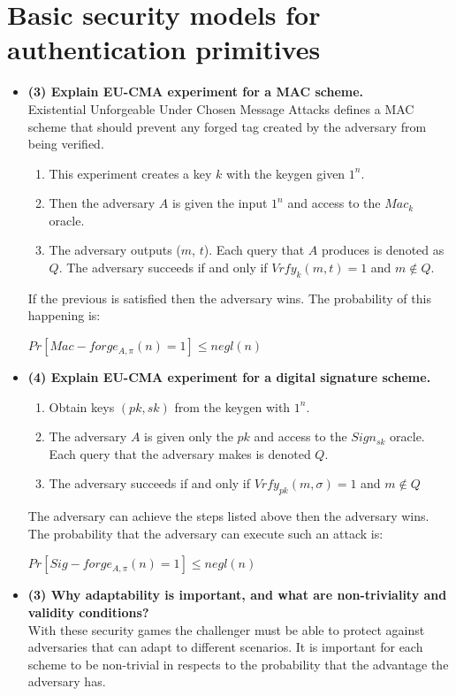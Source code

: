 \documentclass[letterpaper,11pt,notitlepage,fleqn]{article}
\begin{document}
\section{Basic security models for authentication primitives}
\begin{itemize}
    \item \textbf{(3) Explain EU-CMA experiment for a MAC scheme.} \\
        Existential Unforgeable Under Chosen Message Attacks defines a MAC scheme that should prevent any forged tag created by the adversary from being verified.\\ 
        \begin{enumerate}
            \item This experiment creates a key $k$ with the keygen given $1^n$.
            \item Then the adversary $A$ is given the input $1^n$ and access to the $Mac_{k}$ oracle. 
            \item The adversary outputs ($m$, $t$). Each query that $A$ produces is denoted as $Q$. The adversary succeeds if and only if $Vrfy_{k}(m,t) = 1$ and $m \notin Q$.
        \end{enumerate}
                If the previous is satisfied then the adversary wins. The probability of this happening is:
                \begin{center}
                    $Pr[Mac-forge_{A,\pi}(n) = 1] \leq negl(n)$
                \end{center} 
                \cite{katz}
    \item \textbf{(4) Explain EU-CMA experiment for a digital signature scheme.}\\
        \begin{enumerate}
            \item Obtain keys $(pk,sk)$ from the keygen with $1^n$.
            \item The adversary $A$ is given only the $pk$ and access to the $Sign_{sk}$ oracle. Each query that the adversary makes is denoted $Q$. 
            \item The adversary succeeds if and only if  $Vrfy_{pk}(m,\sigma) = 1$ and $m \notin Q$
        \end{enumerate}
        The adversary can achieve the steps listed above then the adversary wins. The probability that the adversary can execute such an attack is: 
        \begin{center}
            $Pr[Sig-forge_{A,\pi}(n) = 1] \leq negl(n)$
        \end{center}
        \cite{katz}

    \item \textbf{(3) Why adaptability is important, and what are non-triviality and  validity conditions?}\\
        With these security games the challenger must be able to protect against adversaries that can adapt to different scenarios. It is important for each scheme to be non-trivial in respects to the probability that the advantage the adversary has.

\end{itemize}
 
\end{document}
